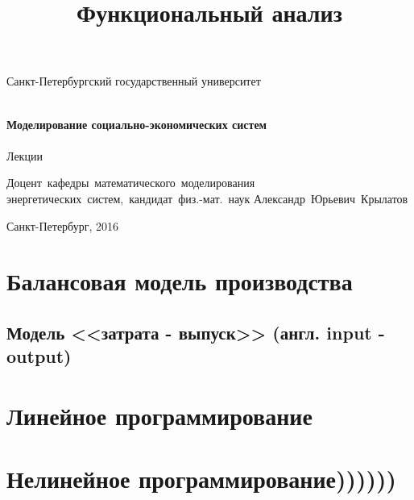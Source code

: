 \documentclass[12pt,a4paper,titlepage,oneside]{book}
\title{Функциональный анализ}
\theoremstyle{definition}
\theoremstyle{plain}
\theoremstyle{remark}
\theoremstyle{remark}
\theoremstyle{plain}
\theoremstyle{plain}
\begin{document}
\begin{titlepage}
\begin{center}

\vfill

Санкт-Петербургский государственный университет\\
\ \\

\vfill

{\large\bf Моделирование социально-экономических систем\\}
\ \\
Лекции 
\vfill

\hfill\vbox
{
\hbox{Доцент кафедры математического моделирования}
\hbox{энергетических систем, кандидат физ.-мат. наук}
\hbox{Александр Юрьевич Крылатов}
}

\vfill

Санкт-Петербург, 2016
\end{center}
\end{titlepage}


\tableofcontents

\chapter{Балансовая модель производства}

\section{Модель <<затрата - выпуск>> (англ. input - output)}

\chapter{Линейное программирование}



\chapter{Нелинейное программирование))))))}
\end{document}
